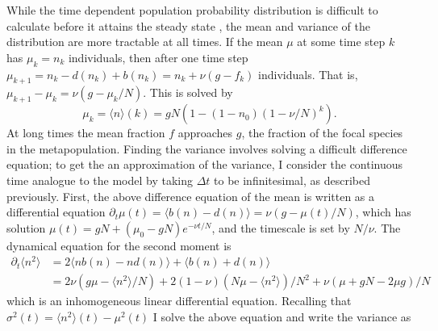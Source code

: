 While the time dependent population probability distribution is difficult to calculate before it attains the steady state \cite{McKane2003}, the mean and variance of the distribution are more tractable at all times. 
If the mean $\mu$ at some time step $k$ has $\mu_k=n_k$ individuals, then after one time step $\mu_{k+1}= n_k - d(n_k) + b(n_k) = n_k + \nu(g-f_k)$ individuals. 
That is, $\mu_{k+1}-\mu_k = \nu(g-\mu_k/N)$. 
This is solved by 
\begin{equation}
 \mu_k = \langle n\rangle(k) = g N \left( 1 - (1-n_0)(1-\nu/N)^k\right).
\end{equation}
At long times the mean fraction $f$ approaches $g$, the fraction of the focal species in the metapopulation. 
Finding the variance involves solving a difficult difference equation; to get the an approximation of the variance, I consider the continuous time analogue to the model by taking $\Delta t$ to be infinitesimal, as described previously. 
First, the above difference equation of the mean is written as a differential equation $\partial_t\mu(t) = \langle b(n)-d(n)\rangle = \nu\left(g-\mu(t)/N\right)$, which has solution $\mu(t) = g N  + (\mu_0-g N)e^{-\nu t/N}$, and the timescale is set by $N/\nu$. 
The dynamical equation for the second moment is
\begin{align*}
 \partial_t\langle n^2\rangle &= 2\langle n b(n) - n d(n)\rangle + \langle b(n) + d(n)\rangle \\
                              &= 2\nu \left( g \mu - \langle n^2\rangle/N\right) + 2(1-\nu)\left(N\mu-\langle n^2\rangle\right)/N^2 + \nu(\mu + g N - 2 \mu g)/N
\end{align*}
which is an inhomogeneous linear differential equation. 
Recalling that $\sigma^2(t) = \langle n^2\rangle(t) - \mu^2(t)$ I solve the above equation and write the variance as
